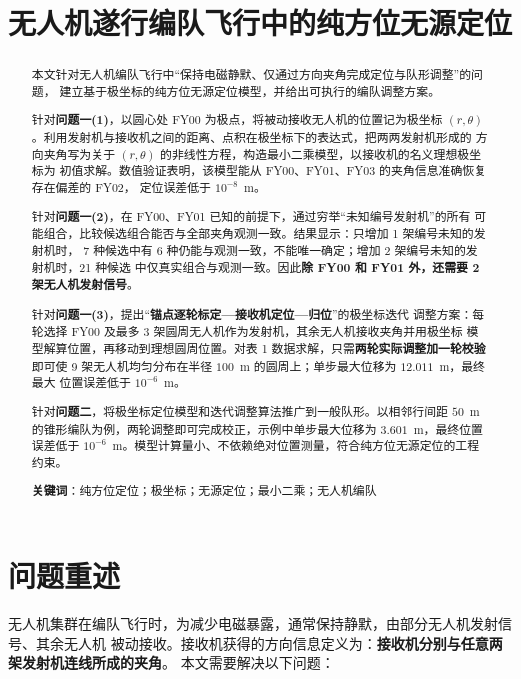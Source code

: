 \documentclass[UTF8,a4paper,11pt]{ctexart}
\title{\textbf{无人机遂行编队飞行中的纯方位无源定位}}
\date{}
\begin{document}
\maketitle

\begin{abstract}
本文针对无人机编队飞行中“保持电磁静默、仅通过方向夹角完成定位与队形调整”的问题，
建立基于极坐标的纯方位无源定位模型，并给出可执行的编队调整方案。

针对\textbf{问题一(1)}，以圆心处 FY00 为极点，将被动接收无人机的位置记为极坐标
$(r,\theta)$。利用发射机与接收机之间的距离、点积在极坐标下的表达式，把两两发射机形成的
方向夹角写为关于 $(r,\theta)$ 的非线性方程，构造最小二乘模型，以接收机的名义理想极坐标为
初值求解。数值验证表明，该模型能从 FY00、FY01、FY03 的夹角信息准确恢复存在偏差的 FY02，
定位误差低于 $10^{-8}$~m。

针对\textbf{问题一(2)}，在 FY00、FY01 已知的前提下，通过穷举“未知编号发射机”的所有
可能组合，比较候选组合能否与全部夹角观测一致。结果显示：只增加 1 架编号未知的发射机时，
7 种候选中有 6 种仍能与观测一致，不能唯一确定；增加 2 架编号未知的发射机时，21 种候选
中仅真实组合与观测一致。因此\textbf{除 FY00 和 FY01 外，还需要 2 架无人机发射信号}。

针对\textbf{问题一(3)}，提出“\textbf{锚点逐轮标定—接收机定位—归位}”的极坐标迭代
调整方案：每轮选择 FY00 及最多 3 架圆周无人机作为发射机，其余无人机接收夹角并用极坐标
模型解算位置，再移动到理想圆周位置。对表 1 数据求解，只需\textbf{两轮实际调整加一轮校验}
即可使 9 架无人机均匀分布在半径 $100$~m 的圆周上；单步最大位移为 $12.011$~m，最终最大
位置误差低于 $10^{-6}$~m。

针对\textbf{问题二}，将极坐标定位模型和迭代调整算法推广到一般队形。以相邻行间距
$50$~m 的锥形编队为例，两轮调整即可完成校正，示例中单步最大位移为 $3.601$~m，最终位置
误差低于 $10^{-6}$~m。模型计算量小、不依赖绝对位置测量，符合纯方位无源定位的工程约束。

\textbf{关键词}：纯方位定位；极坐标；无源定位；最小二乘；无人机编队
\end{abstract}

\section{问题重述}

无人机集群在编队飞行时，为减少电磁暴露，通常保持静默，由部分无人机发射信号、其余无人机
被动接收。接收机获得的方向信息定义为：\textbf{接收机分别与任意两架发射机连线所成的夹角}。
本文需要解决以下问题：
\end{document}
